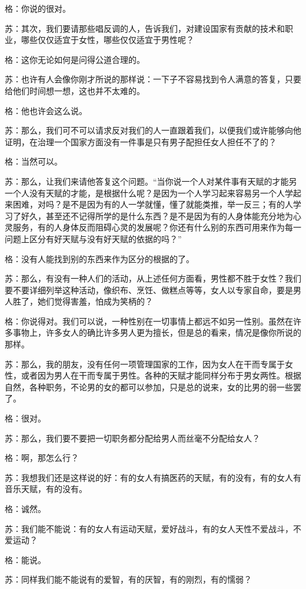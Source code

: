 \documentclass[12pt,oneside]{book}
\begin{document}
格：你说的很对。

苏：其次，我们要请那些唱反调的人，告诉我们，对建设国家有贡献的技术和职业，哪些仅仅适宜于女性，哪些仅仅适宜于男性呢？

格：这你无论如何是问得公道合理的。

苏：也许有人会像你刚才所说的那样说：一下子不容易找到令人满意的答复，只要给他们时间想一想，这也并不太难的。

格：他也许会这么说。

苏：那么，我们可不可以请求反对我们的人一直跟着我们，以便我们或许能够向他证明，在治理一个国家方面没有一件事是只有男子配担任女人担任不了的？

格：当然可以。

苏：那么，让我们来请他答复这个问题。“当你说一个人对某件事有天赋的才能另一个人没有天赋的才能，是根据什么呢？是因为一个人学习起来容易另一个人学起来困难，对吗？是不是因为有的人一学就懂，懂了就能类推，举一反三；有的人学习了好久，甚至还不记得所学的是什么东西？是不是因为有的人身体能充分地为心灵服务，有的人身体反而阻碍心灵的发展呢？你还有什么别的东西可用来作为每一问题上区分有好天赋与没有好天赋的依据的吗？”

格：没有人能找到别的东西来作为区分的根据的了。

苏：那么，有没有一种人们的活动，从上述任何方面看，男性都不胜于女性？我们要不要详细列举这种活动，像织布、烹饪、做糕点等等，女人以专家自命，要是男人胜了，她们觉得害羞，怕成为笑柄的？

格：你说得对。我们可以说，一种性别在一切事情上都远不如另一性别。虽然在许多事物上，许多女人的确比许多男人更为擅长，但是总的看来，情况是像你所说的那样。

苏：那么，我的朋友，没有任何一项管理国家的工作，因为女人在干而专属于女性，或者因为男人在干而专属于男性。各种的天赋才能同样分布于男女两性。根据自然，各种职务，不论男的女的都可以参加，只是总的说来，女的比男的弱一些罢了。

格：很对。

苏：那么，我们要不要把一切职务都分配给男人而丝毫不分配给女人？

格：啊，那怎么行？

苏：我想我们还是这样说的好：有的女人有搞医药的天赋，有的没有，有的女人有音乐天赋，有的没有。

格：诚然。

苏：我们能不能说：有的女人有运动天赋，爱好战斗，有的女人天性不爱战斗，不爱运动？

格：能说。

苏：同样我们能不能说有的爱智，有的厌智，有的刚烈，有的懦弱？
\end{document}
